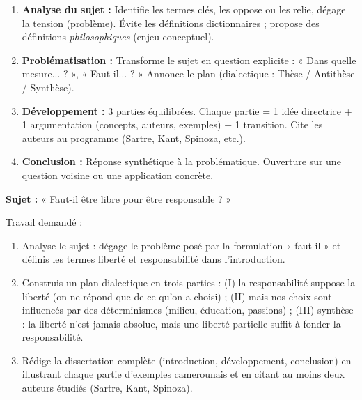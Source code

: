 \documentclass[11pt]{article}
\newcommand{\cle}[1]{{\popxbold\color{popdark}#1}}
\newcounter{popsec}
\newcounter{popsub}
\newcommand{\courssub}[1]{%
  \stepcounter{popsub}%
  \par\vspace{9pt}\noindent{\popxbold\fontsize{11.5}{13}\selectfont\color{popink}{\color{poporange}\thepopsec.\thepopsub}\hspace{6pt}#1}\par\nopagebreak\vspace{4pt}
}
\begin{document}
\courssub{Je me prépare au Bac}

\begin{methode}
\begin{enumerate}
\item \textbf{Analyse du sujet :} Identifie les termes clés, les oppose ou les relie, dégage la tension (problème). Évite les définitions dictionnaires ; propose des définitions \emph{philosophiques} (enjeu conceptuel).
\item \textbf{Problématisation :} Transforme le sujet en question explicite : « Dans quelle mesure... ? », « Faut-il... ? » Annonce le plan (dialectique : Thèse / Antithèse / Synthèse).
\item \textbf{Développement :} 3 parties équilibrées. Chaque partie = 1 idée directrice + 1 argumentation (concepts, auteurs, exemples) + 1 transition. Cite les auteurs au programme (Sartre, Kant, Spinoza, etc.).
\item \textbf{Conclusion :} Réponse synthétique à la problématique. Ouverture sur une question voisine ou une application concrète.
\end{enumerate}
\end{methode}

\begin{exercice}
\textbf{Sujet :} « Faut-il être libre pour être responsable ? »

Travail demandé :
\begin{enumerate}
\item Analyse le sujet : dégage le problème posé par la formulation « faut-il » et définis les termes \cle{liberté} et \cle{responsabilité} dans l'introduction.
\item Construis un plan dialectique en trois parties : (I) la responsabilité suppose la liberté (on ne répond que de ce qu'on a choisi) ; (II) mais nos choix sont influencés par des déterminismes (milieu, éducation, passions) ; (III) synthèse : la liberté n'est jamais absolue, mais une liberté partielle suffit à fonder la responsabilité.
\item Rédige la dissertation complète (introduction, développement, conclusion) en illustrant chaque partie d'exemples camerounais et en citant au moins deux auteurs étudiés (Sartre, Kant, Spinoza).
\end{enumerate}
\end{exercice}
\end{document}
